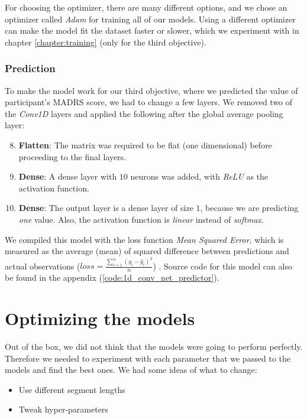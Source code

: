 For choosing the optimizer, there are many different options, and we chose an optimizer called \textit{Adam} for training all of our models. Using a different optimizer can make the model fit the dataset faster or slower, which we experiment with in chapter \ref{chapter:training} (only for the third objective).

\subsubsection{Prediction}
To make the model work for our third objective, where we predicted the value of participant's MADRS score, we had to change a few layers. We removed two of the \textit{Conv1D} layers and applied the following after the global average pooling layer:

\begin{enumerate}
      \setcounter{enumi}{7}
      \item \textbf{Flatten}: The matrix was required to be flat (one dimensional) before proceeding to the final layers.
      \item \textbf{Dense}: A dense layer with $10$ neurons was added, with \textit{ReLU} as the activation function. 
      \item \textbf{Dense}: The output layer is a dense layer of size $1$, because we are predicting \textit{one} value. 
            Also, the activation function is \textit{linear} instead of \textit{softmax}.
\end{enumerate}

We compiled this model with the loss function \textit{Mean Squared Error}, which is measured as the average (mean) of squared difference between predictions and actual observations ($ loss = \frac{\sum_{i=1}^{n}(y_i-\hat{y}_i)^2}{n} $) \cite{loss_functions}. Source code for this model can also be found in the appendix (\ref{code:1d_conv_net_predictor}).

\section{Optimizing the models}

\noindent Out of the box, we did not think that the models were going to perform perfectly. Therefore we needed to experiment with each parameter that we passed to the models and find the best ones. We had some ideas of what to change:

\begin{itemize}
    \item Use different segment lengths
    \item Tweak hyper-parameters
\end{itemize}

